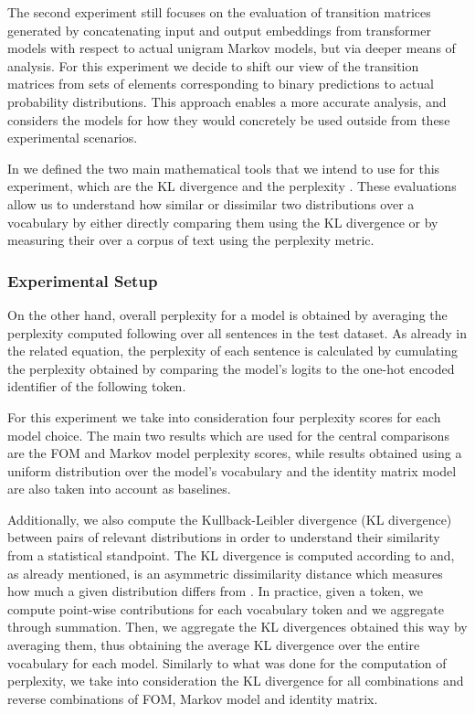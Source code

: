 The second experiment still focuses on the evaluation of transition matrices generated by concatenating input and output embeddings from transformer models with respect to actual unigram Markov models, but via deeper means of analysis.
For this experiment we decide to shift our view of the transition matrices from sets of elements corresponding to binary predictions to actual probability distributions.
This approach enables a more accurate analysis, and considers the models for how they would concretely be used outside from these experimental scenarios.

In  we defined the two main mathematical tools that we intend to use for this experiment, which are the KL divergence  and the perplexity .
These evaluations allow us to understand how similar or dissimilar  two distributions over a vocabulary by either directly comparing them using the KL divergence or by measuring their  over a corpus of text using the perplexity metric. 

\subsubsection{Experimental Setup}

On the other hand, overall perplexity for a model is obtained by averaging the perplexity computed following  over all sentences  in the test dataset.
As already  in the related equation, the perplexity of each sentence is calculated by cumulating  the perplexity obtained by comparing the model's  logits to the one-hot encoded identifier of the following token.

For this experiment we take into consideration four perplexity scores for each model choice.
The main two results which are used for the central comparisons are the FOM and Markov model perplexity scores, while results obtained using a uniform distribution over the model's vocabulary and the identity matrix model are also taken into account as baselines.

Additionally, we also compute the Kullback-Leibler divergence (KL divergence) between pairs of relevant distributions in order to understand their similarity from a statistical standpoint.
The KL divergence is computed according to  and, as already mentioned, is an asymmetric dissimilarity distance which measures how much a given distribution differs from .
In practice, given a token, we compute point-wise contributions for each vocabulary token and we aggregate  through summation.
Then, we  aggregate the KL divergences obtained this way by averaging them, thus obtaining the average KL divergence over the entire vocabulary for each model.
Similarly to what was done for the computation of perplexity, we take into consideration the KL divergence for all combinations and reverse combinations of FOM, Markov model and identity matrix. 

